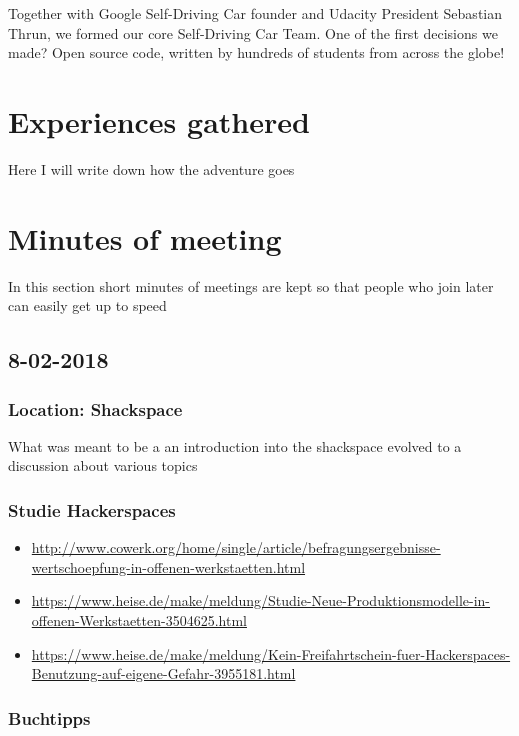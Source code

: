 \documentclass[]{book}
\providecommand{\tightlist}{%
  \setlength{\itemsep}{0pt}\setlength{\parskip}{0pt}}
\begin{document}
Together with Google Self-Driving Car founder and Udacity President
Sebastian Thrun, we formed our core Self-Driving Car Team. One of the
first decisions we made? Open source code, written by hundreds of
students from across the globe!

\chapter{Experiences gathered}\label{experiences}

Here I will write down how the adventure goes

\chapter{Minutes of meeting}\label{minutesOfMeeting}

In this section short minutes of meetings are kept so that people who
join later can easily get up to speed

\section{8-02-2018}\label{section}

\subsection{Location: Shackspace}\label{location-shackspace}

What was meant to be a an introduction into the shackspace evolved to a
discussion about various topics

\subsection{Studie Hackerspaces}\label{studie-hackerspaces}

\begin{itemize}
\tightlist
\item
  \url{http://www.cowerk.org/home/single/article/befragungsergebnisse-wertschoepfung-in-offenen-werkstaetten.html}
\item
  \url{https://www.heise.de/make/meldung/Studie-Neue-Produktionsmodelle-in-offenen-Werkstaetten-3504625.html}
\item
  \url{https://www.heise.de/make/meldung/Kein-Freifahrtschein-fuer-Hackerspaces-Benutzung-auf-eigene-Gefahr-3955181.html}
\end{itemize}

\subsection{Buchtipps}\label{buchtipps}
\end{document}
